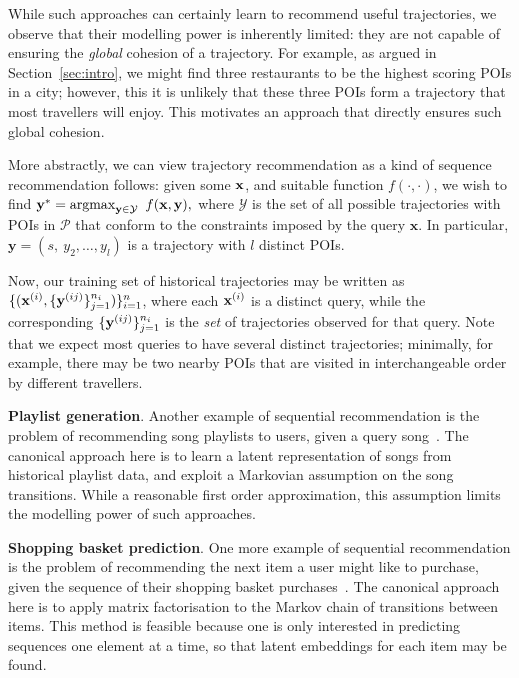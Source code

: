 While such approaches can certainly learn to recommend useful trajectories,
we observe that their modelling power is inherently limited:
they are not capable of ensuring the \emph{global} cohesion of a trajectory.
For example, as argued in Section~\ref{sec:intro},
we might find three restaurants to be the highest scoring POIs in a city;
however, this it is unlikely that these three POIs form a trajectory that most travellers will enjoy.
This motivates an approach that directly ensures such global cohesion.

More abstractly, we can view trajectory recommendation as a kind of sequence recommendation follows:
given some $\mathbf{x}$, and suitable function $f(\cdot,\cdot)$, we wish to find
$\mathbf{y}^* = \operatorname*{argmax}_{\mathbf{y} \in \mathcal{Y}}~f(\mathbf{x}, \mathbf{y}),$
where $\mathcal{Y}$ is the set of all possible trajectories with POIs in $\mathcal{P}$ that conform to the constraints imposed by the query $\mathbf{x}$.
In particular,
$\mathbf{y} = (s,~ y_2, \dots, y_l)$ is a trajectory with $l$ distinct POIs. %

Now, our training set of historical trajectories may be written as
$\{ ( \mathbf{x}^{({i})}, \{ \mathbf{y}^{({ij})} \}_{j=1}^{n_i} ) \}_{i=1}^{n}$,
where each $\mathbf{x}^{({i})}$ is a distinct query,
while the corresponding $\{ \mathbf{y}^{({ij})} \}_{j=1}^{n_i}$ is the \emph{set} of trajectories observed for that query.
Note that we expect most queries to have several distinct trajectories;
minimally,
for example,
there may be two nearby POIs that are visited in interchangeable order by different travellers.


%
\textbf{Playlist generation}.
Another example of sequential recommendation is the problem of recommending song playlists to users, given a query song~\citep{McFee:2011,chen2012playlist,hidasi2015session,choi2016towards}.
The canonical approach here is to
learn a latent representation of songs from historical playlist data,
and exploit a Markovian assumption on the song transitions.
While a reasonable first order approximation, this assumption limits the modelling power of such approaches.


%
\textbf{Shopping basket prediction}.
One more example of sequential recommendation is the problem of recommending the next item a user might like to purchase, given the sequence of their shopping basket purchases~\citep{Rendle:2010,Wang:2015}.
The canonical approach here is to apply matrix factorisation to the Markov chain of transitions between items.
This method is feasible because one is only interested in predicting sequences one element at a time, so that latent embeddings for each item may be found.



